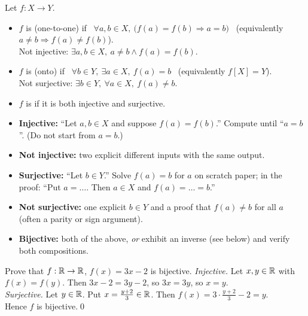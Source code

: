 \begin{key}
Let $f:X\to Y$.
\begin{itemize}
\item $f$ is  (one-to-one) if \ $\forall a,b\in X,\ \big(f(a)=f(b)\Rightarrow a=b\big)$ \ (equivalently $a\neq b\Rightarrow f(a)\neq f(b)$).\\
  Not injective: $\exists a,b\in X,\ a\neq b\wedge f(a)=f(b)$.
\item $f$ is  (onto) if \ $\forall b\in Y,\ \exists a\in X,\ f(a)=b$ \ (equivalently $f[X]=Y$).\\
  Not surjective: $\exists b\in Y,\ \forall a\in X,\ f(a)\neq b$.
\item $f$ is  if it is both injective and surjective.
\end{itemize}
\end{key}

\begin{strategy}[Templates]
\begin{itemize}
\item \textbf{Injective:} ``Let $a,b\in X$ and suppose $f(a)=f(b)$.'' Compute until ``$a=b$''. (Do not start from $a=b$.)
\item \textbf{Not injective:} two explicit different inputs with the same output.
\item \textbf{Surjective:} ``Let $b\in Y$.'' Solve $f(a)=b$ for $a$ on scratch paper; in the proof: ``Put $a=\dots$. Then $a\in X$  and $f(a)=\dots=b$.''
\item \textbf{Not surjective:} one explicit $b\in Y$ and a proof that $f(a)\neq b$ for all $a$ (often a parity or sign argument).
\item \textbf{Bijective:} both of the above, \emph{or} exhibit an inverse (see below) and verify both compositions.
\end{itemize}
\end{strategy}

\begin{hexample}
Prove that $f:\mathbb{R}\to\mathbb{R}$, $f(x)=3x-2$ is bijective.
\solution
\emph{Injective.} Let $x,y\in\mathbb{R}$ with $f(x)=f(y)$. Then $3x-2=3y-2$, so $3x=3y$, so $x=y$.\\
\emph{Surjective.} Let $y\in\mathbb{R}$. Put $x=\frac{y+2}3\in\mathbb{R}$. Then $f(x)=3\cdot\frac{y+2}3-2=y$.\\
Hence $f$ is bijective.\qed
\end{hexample}


